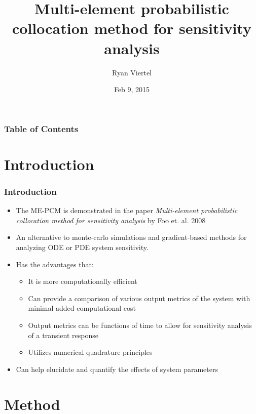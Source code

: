 \documentclass{beamer}
\title{Multi-element probabilistic collocation method for sensitivity analysis}
\author{Ryan Viertel}
\institute{University of Utah}
\date{Feb 9, 2015}
\theoremstyle{plain}
\theoremstyle{definition}
\begin{document}
\begin{frame}
\titlepage
\end{frame}

\begin{frame}
\frametitle{Table of Contents}
\tableofcontents
\end{frame}


\section{Introduction}

\begin{frame}\frametitle{Introduction}
\begin{itemize}
  \item The ME-PCM is demonstrated in the paper \emph{Multi-element probabilistic collocation method for sensitivity analysis} by Foo et. al. 2008
  \item An alternative to monte-carlo simulations and gradient-based methods for analyzing ODE or PDE system sensitivity.
  \item Has the advantages that:
    \begin{itemize}
     \item It is more computationally efficient 
     \item Can provide a comparison of various output metrics of the system with minimal added computational cost 
     \item Output metrics can be functions of time to allow for sensitivity analysis of a transient response
     \item Utilizes numerical quadrature principles
    \end{itemize}
  \item Can help elucidate and quantify the effects of system parameters
\end{itemize}
\end{frame}

\section{Method}
\end{document}
